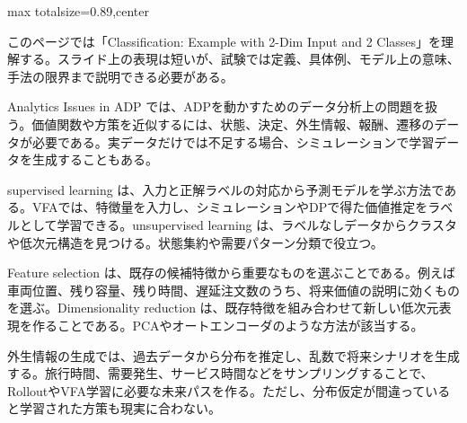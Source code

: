 \begin{minipage}[t]{0.58\textwidth}
\begin{adjustbox}{max totalsize={\textwidth}{0.89\textheight},center}
\begin{minipage}{\textwidth}\scriptsize
{}このページでは「Classification: Example with 2-Dim Input and 2 Classes」を理解する。スライド上の表現は短いが、試験では定義、具体例、モデル上の意味、手法の限界まで説明できる必要がある。\par
Analytics Issues in ADP では、ADPを動かすためのデータ分析上の問題を扱う。価値関数や方策を近似するには、状態、決定、外生情報、報酬、遷移のデータが必要である。実データだけでは不足する場合、シミュレーションで学習データを生成することもある。\par
supervised learning は、入力と正解ラベルの対応から予測モデルを学ぶ方法である。VFAでは、特徴量を入力し、シミュレーションやDPで得た価値推定をラベルとして学習できる。unsupervised learning は、ラベルなしデータからクラスタや低次元構造を見つける。状態集約や需要パターン分類で役立つ。\par
Feature selection は、既存の候補特徴から重要なものを選ぶことである。例えば車両位置、残り容量、残り時間、遅延注文数のうち、将来価値の説明に効くものを選ぶ。Dimensionality reduction は、既存特徴を組み合わせて新しい低次元表現を作ることである。PCAやオートエンコーダのような方法が該当する。\par
外生情報の生成では、過去データから分布を推定し、乱数で将来シナリオを生成する。旅行時間、需要発生、サービス時間などをサンプリングすることで、RolloutやVFA学習に必要な未来パスを作る。ただし、分布仮定が間違っていると学習された方策も現実に合わない。\par

\end{minipage}
\end{adjustbox}
\end{minipage}
